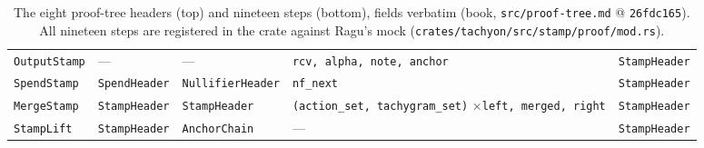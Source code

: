 \documentclass[11pt,a4paper]{article}
\theoremstyle{definition}
\begin{document}
\begin{table}[htbp]
\begin{tabular}{@{}lllp{3.9cm}l@{}}
\texttt{OutputStamp} & --- & --- & \texttt{rcv, alpha, note, anchor}
  & \texttt{StampHeader} \\
\texttt{SpendStamp} & \texttt{SpendHeader} & \texttt{NullifierHeader}
  & \texttt{nf\_next} & \texttt{StampHeader} \\
\texttt{MergeStamp} & \texttt{StampHeader} & \texttt{StampHeader}
  & \texttt{(action\_set, tachygram\_set)} $\times$\newline \texttt{left,
  merged, right} & \texttt{StampHeader} \\
\texttt{StampLift} & \texttt{StampHeader} & \texttt{AnchorChain} & ---
  & \texttt{StampHeader} \\
\bottomrule
\end{tabular}
\caption{The eight proof-tree headers (top) and nineteen steps (bottom),
fields verbatim (book, \texttt{src/proof-tree.md} @ \texttt{26fdc165}).
All nineteen steps are registered in the crate against Ragu's mock
(\texttt{crates/tachyon/src/stamp/proof/mod.rs}).}
\label{tab:tachyon-design-steps}
\end{table}
\end{document}

